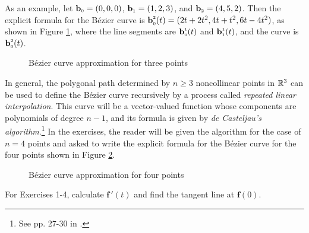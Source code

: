 \begin{exmp}
 As an example, let $\textbf{b}_{\scriptscriptstyle 0} = (0,0,0)$, $\textbf{b}_{\scriptscriptstyle 1} = (1,2,3)$, and $\textbf{b}_{\scriptscriptstyle 2} =
 (4,5,2)$. Then the explicit formula for the B\'{e}zier curve is
 $\textbf{b}_{\scriptscriptstyle 0}^{\scriptscriptstyle 2}(t) = ( 2t + 2t^2, 4t + t^2, 6t - 4t^2 )$, as shown in Figure
 \ref{fig:bezier2}, where the line segments are $\textbf{b}_{\scriptscriptstyle 0}^{\scriptscriptstyle 1}(t)$ and
 $\textbf{b}_{\scriptscriptstyle 1}^{\scriptscriptstyle 1}(t)$, and the curve is
 $\textbf{b}_{\scriptscriptstyle 0}^{\scriptscriptstyle 2}(t)$.\vspace{-14mm}
 \begin{figure}[h]
  \begin{center}
   
  \end{center}\vspace{-16mm}
 \caption[]{\quad B\'{e}zier curve approximation for three points}
 \label{fig:bezier2}
 \end{figure}
\newpage
 In general, the polygonal path determined by $n \ge 3$ noncollinear points in $\mathbb{R}^{3}$ can be used to define
 the B\'{e}zier curve recursively by a process called \emph{repeated linear interpolation}. This curve will be a
 vector-valued function whose components are polynomials of degree $n-1$, and its formula is given by
 \emph{de Casteljau's algorithm}.\footnote{See pp. 27-30 in \cite{far}.} In the exercises, the reader will be given the
 algorithm for the case of $n = 4$ points and asked to write the explicit formula for the B\'{e}zier curve for the four
 points shown in Figure \ref{fig:bezier3}.\vspace{-24mm}
 \begin{figure}[h]
  \begin{center}
   
  \end{center}\vspace{-16mm}
 \caption[]{\quad B\'{e}zier curve approximation for four points}
 \label{fig:bezier3}
 \end{figure}
\end{exmp}\vspace{-12mm}
\startexercises\label{sec1dot8}
\par\noindent For Exercises 1-4, calculate $\textbf{f}\,'(t)$ and find the tangent line at $\textbf{f}(0)$.
